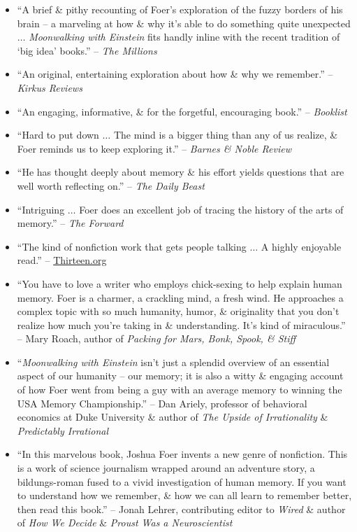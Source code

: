 \documentclass{article}
\begin{document}
\begin{enumerate}
\begin{itemize}
		\item ``A brief \& pithy recounting of {\sc Foer}'s exploration of the fuzzy borders of his brain -- a marveling at how \& why it's able to do something quite unexpected $\ldots$ {\it Moonwalking with {\sc Einstein}} fits handly inline with the recent tradition of `big idea' books.'' -- {\it The Millions}
		\item ``An original, entertaining exploration about how \& why we remember.'' -- {\it Kirkus Reviews}
		\item ``An engaging, informative, \& for the forgetful, encouraging book.'' -- {\it Booklist}
		\item ``Hard to put down $\ldots$ The mind is a bigger thing than any of us realize, \& {\sc Foer} reminds us to keep exploring it.'' -- {\it Barnes \& Noble Review}
		\item ``He has thought deeply about memory \& his effort yields questions that are well worth reflecting on.'' -- {\it The Daily Beast}
		\item ``Intriguing $\ldots$ {\sc Foer} does an excellent job of tracing the history of the arts of memory.'' -- {\it The Forward}
		\item ``The kind of nonfiction work that gets people talking $\ldots$ A highly enjoyable read.'' -- \url{Thirteen.org}
		\item ``You have to love a writer who employs chick-sexing to help explain human memory. {\sc Foer} is a charmer, a crackling mind, a fresh wind. He approaches a complex topic with so much humanity, humor, \& originality that you don't realize how much you're taking in \& understanding. It's kind of miraculous.'' -- {\sc Mary Roach}, author of {\it Packing for Mars, Bonk, Spook, \& Stiff}
		\item ``{\it Moonwalking with {\sc Einstein}} isn't just a splendid overview of an essential aspect of our humanity -- our memory; it is also a witty \& engaging account of how {\sc Foer} went from being a guy with an average memory to winning the USA Memory Championship.'' -- {\sc Dan Ariely}, professor of behavioral economics at Duke University \& author of {\it The Upside of Irrationality} \& {\it Predictably Irrational}
		\item ``In this marvelous book, {\sc Joshua Foer} invents a new genre of nonfiction. This is a work of science journalism wrapped around an adventure story, a bildungs-roman fused to a vivid investigation of human memory. If you want to understand how we remember, \& how we can all learn to remember better, then read this book.'' -- {\sc Jonah Lehrer}, contributing editor to {\it Wired} \& author of {\it How We Decide} \& {\it Proust Was a Neuroscientist}

\end{itemize}
\end{enumerate}
\end{document}

